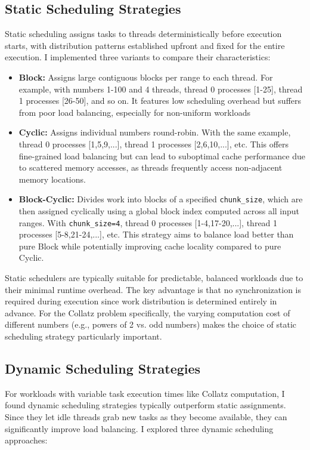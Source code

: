\documentclass[10pt]{article}
\newcommand{\code}[1]{\texttt{#1}}
\begin{document}
\subsection{Static Scheduling Strategies}
Static scheduling assigns tasks to threads deterministically before execution starts, with distribution patterns established upfront and fixed for the entire execution. I implemented three variants to compare their characteristics:
\begin{itemize}
    \item \textbf{Block:} Assigns large contiguous blocks per range to each thread. For example, with numbers 1-100 and 4 threads, thread 0 processes [1-25], thread 1 processes [26-50], and so on. It features low scheduling overhead but suffers from poor load balancing, especially for non-uniform workloads

    \item \textbf{Cyclic:} Assigns individual numbers round-robin. With the same example, thread 0 processes [1,5,9,...], thread 1 processes [2,6,10,...], etc. This offers fine-grained load balancing but can lead to suboptimal cache performance due to scattered memory accesses, as threads frequently access non-adjacent memory locations.

    \item \textbf{Block-Cyclic:} Divides work into blocks of a specified \code{chunk\_size}, which are then assigned cyclically using a global block index computed across all input ranges. With \code{chunk\_size=4}, thread 0 processes [1-4,17-20,...], thread 1 processes [5-8,21-24,...], etc. This strategy aims to balance load better than pure Block while potentially improving cache locality compared to pure Cyclic.
\end{itemize}
Static schedulers are typically suitable for predictable, balanced workloads due to their minimal runtime overhead. The key advantage is that no synchronization is required during execution since work distribution is determined entirely in advance. For the Collatz problem specifically, the varying computation cost of different numbers (e.g., powers of 2 vs. odd numbers) makes the choice of static scheduling strategy particularly important.


\subsection{Dynamic Scheduling Strategies}
For workloads with variable task execution times like Collatz computation, I found dynamic scheduling strategies typically outperform static assignments. Since they let idle threads grab new tasks as they become available, they can significantly improve load balancing. I explored three dynamic scheduling approaches:
\end{document}
